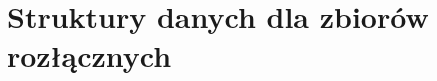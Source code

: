 \chapter{Struktury danych dla zbiorów rozłącznych}

\makeatletter
{}
\makeatother






\problems




